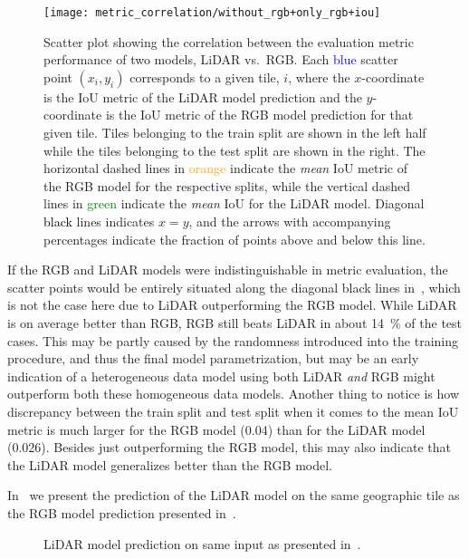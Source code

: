 \begin{figure}[H]
  \centering
  \texttt{[image: metric\_correlation/without\_rgb+only\_rgb+iou]}
  \caption{%
    Scatter plot showing the correlation between the evaluation metric performance of two models, LiDAR vs.\ RGB\@.
    Each \textcolor{blue}{blue} scatter point $(x_i, y_i)$ corresponds to a given tile, $i$, where the $x$-coordinate is the IoU metric of the LiDAR model prediction and the $y$-coordinate is the IoU metric of the RGB model prediction for that given tile.
    Tiles belonging to the train split are shown in the left half while the tiles belonging to the test split are shown in the right.
    The horizontal dashed lines in \textcolor{orange}{orange} indicate the \emph{mean} IoU metric of the RGB model for the respective splits, while the vertical dashed lines in \textcolor{green}{green} indicate the \emph{mean} IoU for the LiDAR model.
    Diagonal \textcolor{black}{black} lines indicates $x = y$, and the arrows with accompanying percentages indicate the fraction of points above and below this line.
  }%
  \label{fig:rgb-lidar-correlation}
\end{figure}

If the RGB and LiDAR models were indistinguishable in metric evaluation, the scatter points would be entirely situated along the diagonal black lines in~, which is not the case here due to LiDAR outperforming the RGB model.
While LiDAR is on average better than RGB, RGB still beats LiDAR in about \SI{14}{\percent} of the test cases.
This may be partly caused by the randomness introduced into the training procedure, and thus the final model parametrization, but may be an early indication of a heterogeneous data model using both LiDAR \emph{and} RGB might outperform both these homogeneous data models.
Another thing to notice is how discrepancy between the train split and test split when it comes to the mean IoU metric is much larger for the RGB model (\num{0.04}) than for the LiDAR model (\num{0.026}).
Besides just outperforming the RGB model, this may also indicate that the LiDAR model generalizes better than the RGB model.

In~ we present the prediction of the LiDAR model on the same geographic tile as the RGB model prediction presented in~.

\begin{figure}[H]
  \centering
  \caption{%
    LiDAR model prediction on same input as presented in~.
  }%
  \label{fig:lidar-fundamental-issues}
\end{figure}

